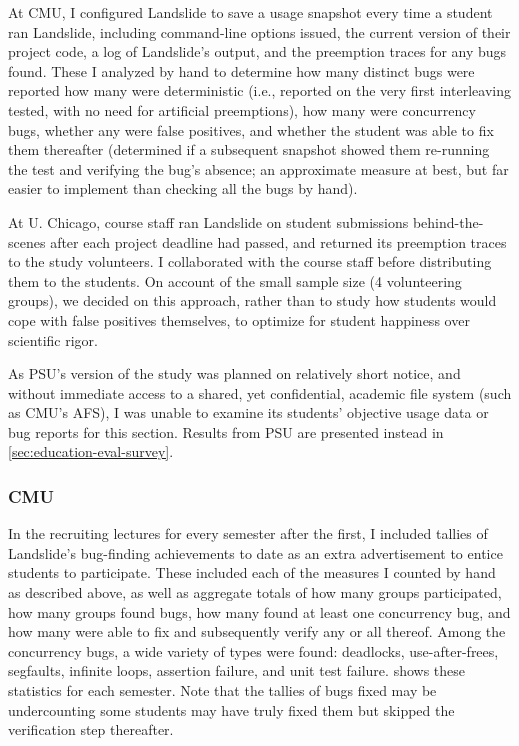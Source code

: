 At CMU, I configured Landslide to save a usage snapshot every time a student ran Landslide,
including command-line options issued, the current version of their project code,
a log of Landslide's output,
and the preemption traces for any bugs found.
These I analyzed by hand to determine how many distinct bugs were reported
how many were deterministic
(i.e., reported on the very first interleaving tested, with no need for artificial preemptions),
how many were concurrency bugs,
whether any were false positives,
and whether the student was able to fix them thereafter
(determined if a subsequent snapshot showed them re-running the test and verifying the bug's absence;
an approximate measure at best, but far easier to implement than checking all the bugs by hand).

At U. Chicago,
course staff ran Landslide on student submissions behind-the-scenes
after each project deadline had passed,
and returned its preemption traces to the study volunteers.
I collaborated with the course staff
before distributing them to the students.
On account of the small sample size (4 volunteering groups),
we decided on this approach,
rather than to study how students would cope with false positives themselves,
to optimize for student happiness over scientific rigor.

As PSU's version of the study was planned on relatively short notice,
and without immediate access to a shared, yet confidential, academic file system (such as CMU's AFS),
I was unable to examine its students' objective usage data or bug reports for this section.
Results from PSU are presented instead in \cref{sec:education-eval-survey}.

\subsubsection{CMU}
\label{sec:education-eval-bugs-cmu}

In the recruiting lectures for every semester after the first,
I included tallies of Landslide's bug-finding achievements to date
as an extra advertisement to entice students to participate.
These included each of the measures I counted by hand as described above,
as well as aggregate totals of how many groups participated,
how many groups found bugs,
how many found at least one concurrency bug,
and how many were able to fix and subsequently verify any or all thereof.
Among the concurrency bugs, a wide variety of types were found:
deadlocks, use-after-frees, segfaults, infinite loops, assertion failure, and unit test failure.
 shows these statistics for each semester.
Note that the tallies of bugs fixed may be undercounting
 some students may have truly fixed them but skipped the verification step thereafter.

